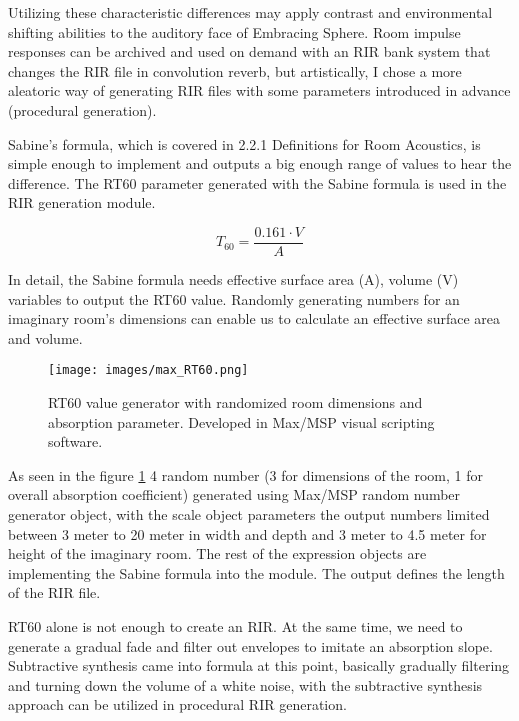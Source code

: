             Utilizing these characteristic differences may apply contrast and environmental shifting abilities to the auditory face of Embracing Sphere. Room impulse responses can be archived and used on demand with an RIR bank system that changes the RIR file in convolution reverb, but artistically, I chose a more aleatoric way of generating RIR files with some parameters introduced in advance (procedural generation).\par

            Sabine's formula, which is covered in 2.2.1 Definitions for Room Acoustics, is simple enough to implement and outputs a big enough range of values to hear the difference. The RT60 parameter generated with the Sabine formula is used in the RIR generation module.\par
                    
            $$T_{60} = \frac{0.161 \cdot V}{A}$$
                    
            In detail, the Sabine formula needs effective surface area (A), volume (V) variables to output the RT60 value. Randomly generating numbers for an imaginary room's dimensions can enable us to calculate an effective surface area and volume.\par

        \begin{figure}[H]
            \centering
            \texttt{[image: images/max\_RT60.png]}
            \caption{RT60 value generator with randomized room dimensions and absorption parameter. Developed in Max/MSP visual scripting software.}
            \label{fig:RT60_MAX}
        \end{figure}
        
        As seen in the figure \ref{fig:RT60_MAX} 4 random number (3 for dimensions of the room, 1 for overall absorption coefficient) generated using Max/MSP random number generator object, with the scale object parameters the output numbers limited between 3 meter to 20 meter in width and depth and 3 meter to 4.5 meter for height of the imaginary room. The rest of the expression objects are implementing the Sabine formula into the module. The output defines the length of the RIR file.\par

        RT60 alone is not enough to create an RIR. At the same time, we need to generate a gradual fade and filter out envelopes to imitate an absorption slope. Subtractive synthesis came into formula at this point, basically gradually filtering and turning down the volume of a white noise, with the subtractive synthesis approach can be utilized in procedural RIR generation.\par

